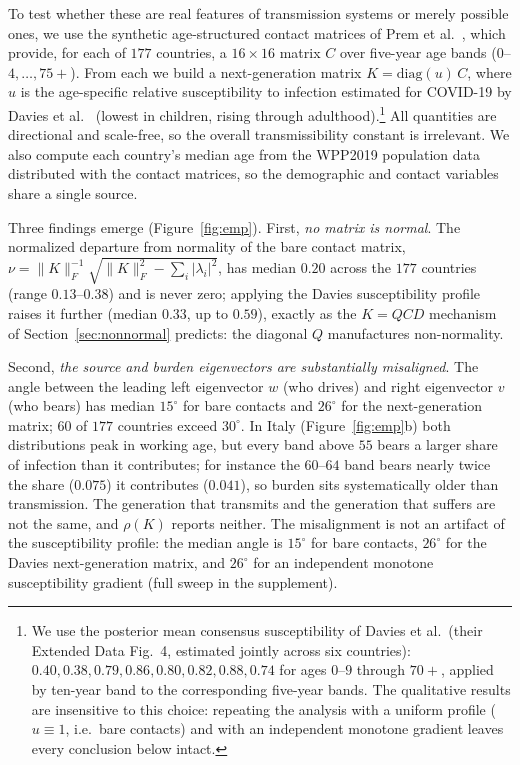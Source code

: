 \documentclass[12pt]{article}
\begin{document}
To test whether these are real features of transmission systems or merely possible ones, we use the synthetic age-structured contact matrices of Prem et al.\ \cite{prem2021}, which provide, for each of $177$ countries, a $16\times16$ matrix $C$ over five-year age bands ($0$--$4,\dots,75+$). From each we build a
next-generation matrix $K=\mathrm{diag}(u)\,C$, where $u$ is the age-specific relative susceptibility to infection estimated for COVID-19 by Davies et al.\ \cite{davies2020} (lowest in children, rising through adulthood).\footnote{We use
the posterior mean consensus susceptibility of Davies et al.\ (their Extended Data
Fig.~4, estimated jointly across six countries): $0.40, 0.38, 0.79, 0.86, 0.80,
0.82, 0.88, 0.74$ for ages $0$--$9$ through $70+$, applied by ten-year band to the
corresponding five-year bands. The qualitative results are insensitive to this
choice: repeating the analysis with a uniform profile ($u\equiv1$, i.e.\ bare
contacts) and with an independent monotone gradient leaves every conclusion below
intact.} All quantities are directional and scale-free, so the overall transmissibility constant is irrelevant. We also compute each country's median age from the WPP2019 population data distributed with the contact matrices, so the demographic and contact variables share a single source.

Three findings emerge (Figure~\ref{fig:emp}). First, \emph{no matrix is normal}. The normalized departure from normality of the bare contact matrix,
$\nu=\lVert K\rVert_F^{-1}\sqrt{\lVert K\rVert_F^{2}-\sum_i|\lambda_i|^2}$, has median $0.20$ across the $177$ countries (range $0.13$--$0.38$) and is never zero; applying the Davies susceptibility profile raises it further (median $0.33$, up to $0.59$), exactly as the $K=QCD$ mechanism of Section~\ref{sec:nonnormal} predicts: the diagonal $Q$ manufactures non-normality.

Second, \emph{the source and burden eigenvectors are substantially misaligned}. The angle between the leading left eigenvector $w$ (who drives) and right eigenvector $v$ (who bears) has median $15^{\circ}$ for bare contacts and
$26^{\circ}$ for the next-generation matrix; $60$ of $177$ countries exceed $30^{\circ}$. In Italy (Figure~\ref{fig:emp}b) both distributions peak in working age, but every band above $55$ bears a larger share of infection than it contributes; for instance the $60$--$64$ band bears nearly twice the share ($0.075$) it contributes ($0.041$), so burden sits systematically older than transmission. The generation that transmits and the generation that suffers are not the same, and $\rho(K)$ reports neither. The misalignment is not an artifact of the susceptibility profile: the median angle is $15^{\circ}$ for bare contacts, $26^{\circ}$ for the Davies next-generation matrix, and $26^{\circ}$ for an independent monotone susceptibility gradient (full sweep in the supplement).
\end{document}
